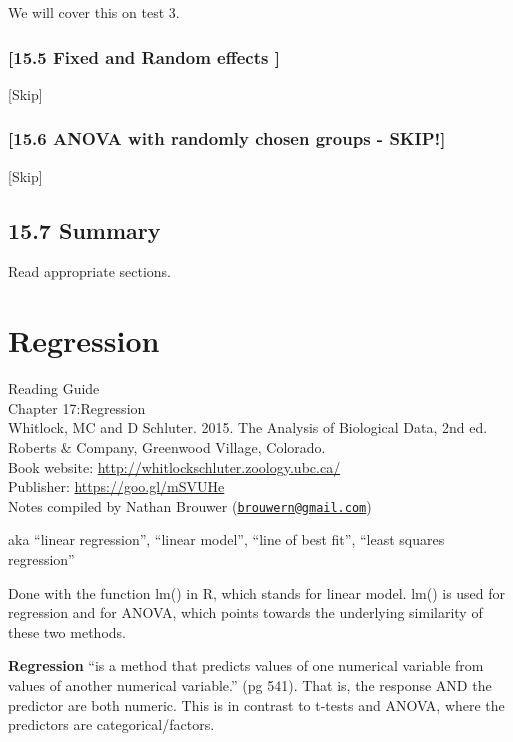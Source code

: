 \documentclass[]{book}
\theoremstyle{definition}
\theoremstyle{definition}
\theoremstyle{definition}
\theoremstyle{remark}
\begin{document}
We will cover this on test 3.

\subsection{{[}15.5 Fixed and Random effects
{]}}\label{fixed-and-random-effects}

{[}Skip{]}

\subsection{{[}15.6 ANOVA with randomly chosen groups -
SKIP!{]}}\label{anova-with-randomly-chosen-groups---skip}

{[}Skip{]}

\section{15.7 Summary}\label{summary-6}

Read appropriate sections.

\chapter{Regression}\label{regression}

Reading Guide\\
Chapter 17:Regression\\
Whitlock, MC and D Schluter. 2015. The Analysis of Biological Data, 2nd
ed. Roberts \& Company, Greenwood Village, Colorado.\\
Book website: \url{http://whitlockschluter.zoology.ubc.ca/}\\
Publisher: \url{https://goo.gl/mSVUHe}\\
Notes compiled by Nathan Brouwer
(\href{mailto:brouwern@gmail.com}{\nolinkurl{brouwern@gmail.com}})

aka ``linear regression'', ``linear model'', ``line of best fit'',
``least squares regression''

Done with the function lm() in R, which stands for linear model. lm() is
used for regression and for ANOVA, which points towards the underlying
similarity of these two methods.

\textbf{Regression} ``is a method that predicts values of one numerical
variable from values of another numerical variable.'' (pg 541). That is,
the response AND the predictor are both numeric. This is in contrast to
t-tests and ANOVA, where the predictors are categorical/factors.
\end{document}
